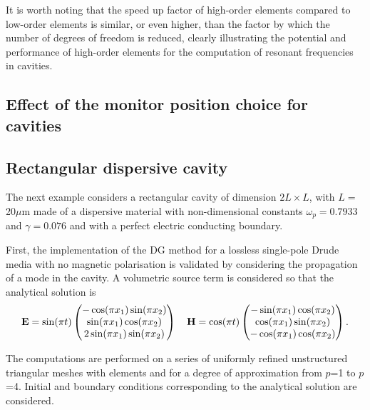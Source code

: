 It is worth noting that the speed up factor of high-order elements compared to low-order elements is similar, or even higher, than the factor by which the number of degrees of freedom is reduced, clearly illustrating the potential and performance of high-order elements for the computation of resonant frequencies in cavities.


\clearpage
\subsection{Effect of the monitor position choice for cavities}
\clearpage
\subsection{Rectangular dispersive cavity}
The next example considers a rectangular cavity of dimension $2L \times L$, with $L=$20$\mu$m made of a dispersive material with non-dimensional constants $\omega_p = 0.7933$ and $\gamma = 0.076$ and with a perfect electric conducting boundary.

First, the implementation of the DG method for a lossless single-pole Drude media with no magnetic polarisation is validated by considering the propagation of a mode in the cavity. A volumetric source term is considered so that the analytical solution is
% 
\begin{equation*}
\E = \sin (\pi t) 
\begin{pmatrix}
- \cos (\pi x_1) \sin (\pi x_2) \\
  \sin (\pi x_1) \cos (\pi x_2) \\
2 \sin (\pi x_1) \sin (\pi x_2) 
\end{pmatrix}
%
\quad
%
\H = \cos (\pi t) 
\begin{pmatrix}
- \sin (\pi x_1) \cos (\pi x_2) \\
  \cos (\pi x_1) \sin (\pi x_2) \\
- \cos (\pi x_1) \cos (\pi x_2) 
\end{pmatrix}.
\end{equation*}

The computations are performed on a series of uniformly refined unstructured triangular meshes with elements and for a degree of approximation from $p$=1 to $p$=4. Initial and boundary conditions corresponding to the analytical solution are considered.

